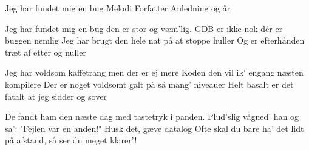 \begin{song}{Jeg har fundet mig en bug}
  {} %
  {Melodi} %
  {Forfatter} %
  {Anledning og år} %
  {\NotCCLIed} %

  \begin{SBVerse}
Jeg har fundet mig en bug
den er stor og væm’lig.
GDB er ikke nok
dér er buggen nemlig
Jeg har brugt den hele nat
på at stoppe huller
Og er efterhånden træt
af etter og nuller
  \end{SBVerse}

  \begin{SBVerse}
Jeg har voldsom kaffetrang
men der er ej mere
Koden den vil ik’ engang
næsten kompilere
Der er noget voldsomt galt
på så mang’ niveauer
Helt basalt er det fatalt
at jeg sidder og sover
  \end{SBVerse}

  \begin{SBVerse}
De fandt ham den næste dag
med tastetryk i panden.
Plud’slig vågned’ han og sa’:
"Fejlen var en anden!"
Husk det, gæve datalog
Ofte skal du bare
ha’ det lidt på afstand,
så ser du meget klarer’!
  \end{SBVerse}
\end{song}